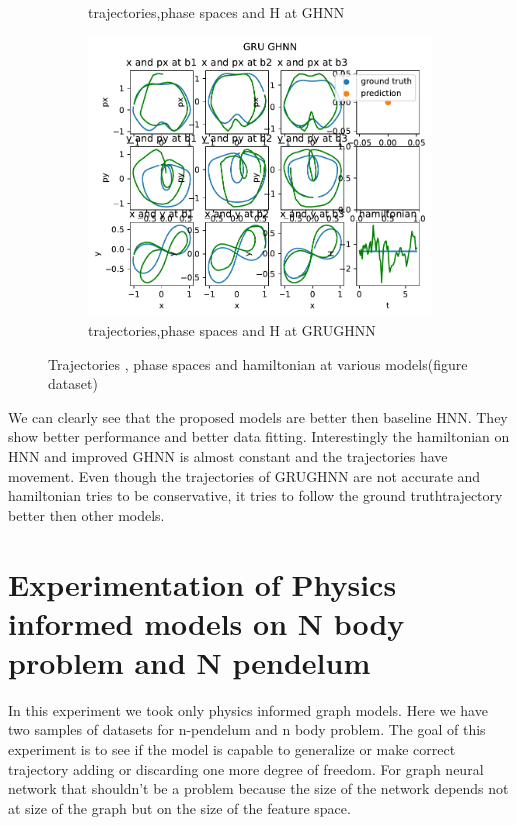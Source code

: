 \begin{figure}[H]
\begin{subfigure}[b]{0.3\textwidth}
		\caption{trajectories,phase spaces and H at GHNN}
	\end{subfigure}
	\hfill
	\begin{subfigure}[b]{0.3\textwidth}
		\centering
		\includegraphics[width=\textwidth]{chapters/chapter5/fignew_gru_ghnn_traj.pdf}
		\caption{trajectories,phase spaces and H at GRUGHNN}
	\end{subfigure}
	
	\caption{Trajectories , phase spaces and hamiltonian at various models(figure dataset)}
	\label{fig_traj}
\end{figure}
We can clearly see that the proposed models are better then baseline HNN. They show better performance and better data fitting. Interestingly the hamiltonian on HNN and improved GHNN is almost constant and the trajectories have movement. Even though the trajectories of GRUGHNN are not accurate and hamiltonian tries to be conservative, it tries to follow the ground truthtrajectory better then other models.  



\section{Experimentation of Physics informed models on N body problem and N pendelum}
In this experiment we took only physics informed graph models. Here we have two samples of datasets for n-pendelum and n body problem. The goal of this experiment is to see if the model is capable to generalize or make correct trajectory adding or discarding one more degree of freedom. For graph neural network that shouldn't be a problem because the size of the network depends not at size of the graph but on the size of the feature space.

